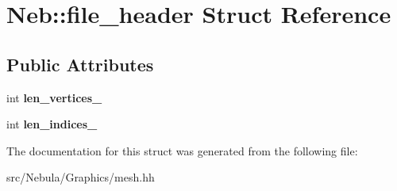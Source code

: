 \hypertarget{structNeb_1_1file__header}{\section{Neb\-:\-:file\-\_\-header Struct Reference}
\label{structNeb_1_1file__header}
}
\subsection*{Public Attributes}
\begin{DoxyCompactItemize}
\item 
\hypertarget{structNeb_1_1file__header_aeb806255496ccbd26327a962d308a314}{int {\bfseries len\-\_\-vertices\-\_\-}}\label{structNeb_1_1file__header_aeb806255496ccbd26327a962d308a314}

\item 
\hypertarget{structNeb_1_1file__header_ac7e0c2f819a800e70c6d24a04f99b884}{int {\bfseries len\-\_\-indices\-\_\-}}\label{structNeb_1_1file__header_ac7e0c2f819a800e70c6d24a04f99b884}

\end{DoxyCompactItemize}


The documentation for this struct was generated from the following file\-:\begin{DoxyCompactItemize}
\item 
src/\-Nebula/\-Graphics/mesh.\-hh\end{DoxyCompactItemize}
